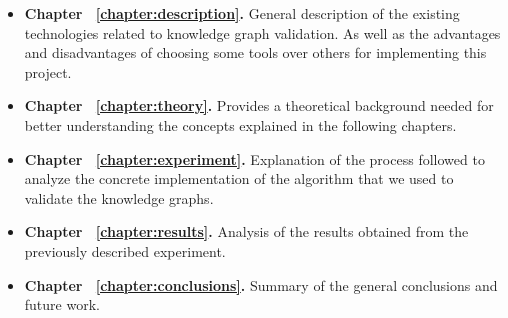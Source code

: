 \begin{itemize}
    \item \textbf{Chapter ~\ref{chapter:description}.} General description of the existing technologies related to knowledge graph validation. As well as the advantages and disadvantages of choosing some tools over others for implementing this project.
    \item \textbf{Chapter ~\ref{chapter:theory}.} Provides a theoretical background needed for better understanding the concepts explained in the following chapters.
    \item \textbf{Chapter ~\ref{chapter:experiment}.} Explanation of the process followed to analyze the concrete implementation of the algorithm that we used to validate the knowledge graphs.
    \item \textbf{Chapter ~\ref{chapter:results}.} Analysis of the results obtained from the previously described experiment.
    \item \textbf{Chapter ~\ref{chapter:conclusions}.} Summary of the general conclusions and future work.
\end{itemize}